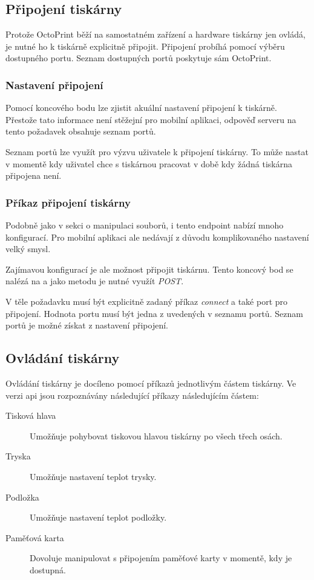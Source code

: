 \subsection{Připojení tiskárny}

Protože OctoPrint běží na samostatném zařízení a hardware tiskárny jen ovládá, je nutné ho k tiskárně explicitně připojit.
Připojení probíhá pomocí výběru dostupného portu.
Seznam dostupných portů poskytuje sám OctoPrint.

\subsubsection*{Nastavení připojení}

Pomocí koncového bodu  lze zjistit akuální nastavení připojení k tiskárně.
Přestože tato informace není stěžejní pro mobilní aplikaci, odpověď serveru na tento požadavek obsahuje seznam portů.

Seznam portů lze využít pro výzvu uživatele k připojení tiskárny.
To může nastat v momentě kdy uživatel chce s tiskárnou pracovat v době kdy žádná tiskárna připojena není.

\subsubsection*{Příkaz připojení tiskárny}

Podobně jako v sekci o manipulaci souborů, i tento endpoint nabízí mnoho konfigurací.
Pro mobilní aplikaci ale nedávají z důvodu komplikovaného nastavení velký smysl.

Zajímavou konfigurací je ale možnost připojit tiskárnu.
Tento koncový bod se nalézá na  a jako metodu je nutné využít \textit{POST}.

V těle požadavku musí být explicitně zadaný příkaz \textit{connect} a také port pro připojení.
Hodnota portu musí být jedna z uvedených v seznamu portů.
Seznam portů je možné získat z nastavení připojení.

\subsection{Ovládání tiskárny}

Ovládání tiskárny je docíleno pomocí příkazů jednotlivým částem tiskárny.
Ve verzi \acrshort{api} \vapi{} jsou rozpoznávány následující příkazy následujícím částem:

\begin{description}
	\item[Tisková hlava] Umožňuje pohybovat tiskovou hlavou tiskárny po všech třech osách.
	\item[Tryska] Umožňuje nastavení teplot trysky.
	\item[Podložka] Umožňuje nastavení teplot podložky.
	\item[Paměťová karta] Dovoluje manipulovat s připojením paměťové karty v momentě, kdy je dostupná.
\end{description}

